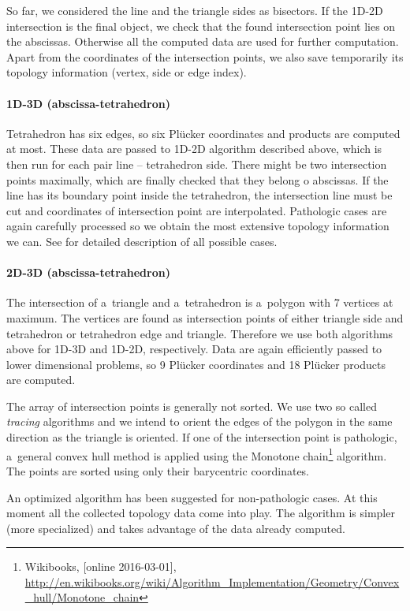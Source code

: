 \documentclass[dvipsnames,FM,Dis]{tulthesis}
\begin{document}
So far, we considered the line and the triangle sides as bisectors. If the 1D-2D intersection is the final object,
we check that the found intersection point lies on the abscissas. Otherwise all the computed data are used for 
further computation. Apart from the coordinates of the intersection points, we also save temporarily its topology
information (vertex, side or edge index).

\paragraph{1D-3D (abscissa-tetrahedron)}
Tetrahedron has six edges, so six Pl\"{u}cker coordinates and products are computed at most. These data are
passed to 1D-2D algorithm described above, which is then run for each pair line -- tetrahedron side. 
There might be two intersection points maximally, which are finally checked that they belong o abscissas.
If the line has its boundary point inside the tetrahedron, the intersection line must be cut
and coordinates of intersection point are interpolated.
Pathologic cases are again carefully processed so we obtain the most extensive topology information we can.
See \cite{fris_dp_2015} for detailed description of all possible cases.

\paragraph{2D-3D (abscissa-tetrahedron)}
The intersection of a~triangle and a~tetrahedron is a~polygon with 7 vertices at maximum. The vertices
are found as intersection points of either triangle side and tetrahedron or tetrahedron edge and triangle.
Therefore we use both algorithms above for 1D-3D and 1D-2D, respectively. Data are again efficiently passed
to lower dimensional problems, so 9 Pl\"{u}cker coordinates and 18 Pl\"{u}cker products are computed. 

The array of intersection points is generally not sorted. We use two so called \emph{tracing} algorithms and we
intend to orient the edges of the polygon in the same direction as the triangle is oriented.
If one of the intersection point is pathologic, a~general convex hull method is applied using the Monotone 
chain\footnote{Wikibooks, [online 2016-03-01], 
      \url{http://en.wikibooks.org/wiki/Algorithm_Implementation/Geometry/Convex_hull/Monotone_chain}} 
algorithm. The points are sorted using only their barycentric coordinates.

An optimized algorithm has been suggested for non-pathologic cases. At this moment all the collected topology 
data come into play. The algorithm is simpler (more specialized) and takes advantage of the data already computed.
\end{document}
